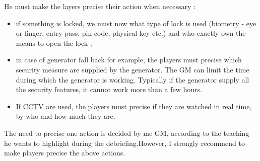 \documentclass[11pt]{article} %
\begin{document}
He must make the layers precise their action when necessary :
\begin{itemize}
\item if something is locked, we must now what type of lock is used (biometry -  eye or finger, 
entry pass, pin code, physical key etc.) and who exactly own the means to open the lock ;
\item in case of generator fall back for example, the players must precise which security 
measure are supplied by the generator. The GM can limit the time during which the generator
is working. Typically if the generator supply all the security features, it cannot work more than 
a few hours.
\item If CCTV are used, the players must precise if they are watched in real time, 
by who and how much they are. 
\end{itemize}
%

The need to precise one action is decided by me GM, according to the teaching 
he wants to highlight during the debriefing.However, I strongly recommend to 
make players precise the above actions.
\end{document}
